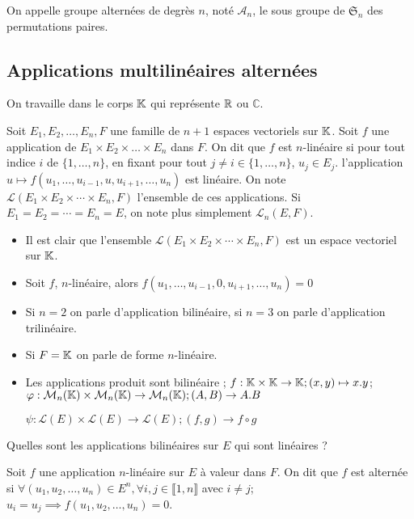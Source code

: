 \begin{defini}
    On appelle groupe alternées de degrès $n$, noté $\mathcal{A}_n$, le sous groupe de $\mathfrak{S}_n$ des permutations paires.
\end{defini}
\subsection{Applications multilinéaires alternées}
On travaille dans le corps $\mathbb{K}$ qui représente $\mathbb{R}$ ou $\mathbb{C}$.
\begin{defini}
    Soit $E_1,E_2,\dots,E_n,F$ une famille de $n+1$ espaces vectoriels sur $\mathbb{K}$. Soit $f$ une application de $E_1\times E_2\times \dots \times E_n$ dans $F$. On dit que $f$ est $n$-linéaire si pour tout indice $i$ de $\{1,\dots,n\}$, en fixant pour tout $j\neq i \in \{1,\dots,n\}$, $u_j\in E_j$.
    l'application $u \mapsto f(u_1,\dots,u_{i-1},u,u_{i+1},\dots,u_n)$ est linéaire.
    On note $\mathcal{L}(E_1\times E_2\times \cdots \times E_n, F)$ l'ensemble de ces applications. Si $E_1=E_2=\cdots=E_n=E$, on note plus simplement $\mathcal{L}_n(E,F)$.
\end{defini}
\begin{ex}
    \begin{itemize}
        \item Il est clair que l'ensemble $\mathcal{L}(E_1\times E_2\times \cdots \times E_n, F)$ est un espace vectoriel sur $\mathbb{K}$.
        \item Soit $f$, $n$-linéaire, alors $f(u_1,\dots,u_{i-1},0,u_{i+1},\dots,u_n)=0$
        \item Si $n=2$ on parle d'application bilinéaire, si $n=3$ on parle d'application trilinéaire.
        \item Si $F=\mathbb{K}$ on parle de forme $n$-linéaire.
        \item Les applications produit sont bilinéaire ; $f:\mathbb{K}\times\mathbb{K}\to\mathbb{K};(x,y)\mapsto x.y$; $\varphi:\mathcal{M}_n(\mathbb{K})\times\mathcal{M}_n(\mathbb{K})\to\mathcal{M}_n(\mathbb{K}); (A,B)\to A.B$ 
        
        $\psi:\mathcal{L}(E)\times\mathcal{L}(E)\to\mathcal{L}(E); (f,g)\to f\circ g$
    \end{itemize}
\end{ex}
\begin{exo}
    Quelles sont les applications bilinéaires sur $E$ qui sont linéaires ?
\end{exo}
\begin{defini}
    Soit $f$ une application $n$-linéaire sur $E$ à valeur dans $F$. On dit que $f$ est alternée si $\forall(u_1,u_2,\dots,u_n)\in E^n,\forall i,j \in \llbracket 1,n\rrbracket$ avec $i\neq j$; $u_i=u_j\implies f(u_1,u_2,\dots,u_n)=0$.
\end{defini}
